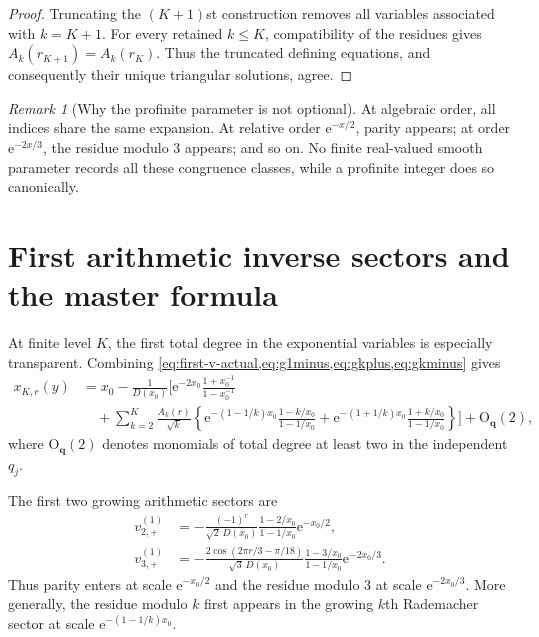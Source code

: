 \documentclass[11pt,a4paper]{article}
\numberwithin{equation}{section}
\theoremstyle{remark}
\newtheorem{remark}[theorem]{Remark}
\newcommand{\e}{\mathrm e}
\newcommand{\bigO}{\mathrm O}
\begin{document}
\begin{proof}
Truncating the $(K+1)$st construction removes all variables associated with $k=K+1$.  For every retained $k\le K$, compatibility of the residues gives
$A_k(r_{K+1})=A_k(r_K)$.  Thus the truncated defining equations, and consequently their unique triangular solutions, agree.
\end{proof}

\begin{remark}[Why the profinite parameter is not optional]
At algebraic order, all indices share the same expansion.  At relative order $\e^{-x/2}$, parity appears; at order $\e^{-2x/3}$, the residue modulo $3$ appears; and so on.  No finite real-valued smooth parameter records all these congruence classes, while a profinite integer does so canonically.
\end{remark}

\section{First arithmetic inverse sectors and the master formula}\label{sec:first-inverse-sectors}

At finite level $K$, the first total degree in the exponential variables is especially transparent.  Combining \cref{eq:first-v-actual,eq:g1minus,eq:gkplus,eq:gkminus} gives
\begin{align}
 x_{K,r}(y)
 &=x_0-\frac1{D(x_0)}\Biggl[
 \e^{-2x_0}\frac{1+x_0^{-1}}{1-x_0^{-1}}
 \label{eq:first-all-sectors}\\
 &\quad+\sum_{k=2}^{K}\frac{A_k(r)}{\sqrt{k}}
 \left\{
 \e^{-(1-1/k)x_0}\frac{1-k/x_0}{1-1/x_0}
 +\e^{-(1+1/k)x_0}\frac{1+k/x_0}{1-1/x_0}
 \right\}\Biggr]
 +\bigO_{\bm q}(2),\nonumber
\end{align}
where $\bigO_{\bm q}(2)$ denotes monomials of total degree at least two in the independent $q_j$.

The first two growing arithmetic sectors are
\begin{align}
 v_{2,+}^{(1)}
 &=-\frac{(-1)^r}{\sqrt2\,D(x_0)}
 \frac{1-2/x_0}{1-1/x_0}\e^{-x_0/2},
 \label{eq:k2-inverse}\\
 v_{3,+}^{(1)}
 &=-\frac{2\cos(2\pi r/3-\pi/18)}{\sqrt3\,D(x_0)}
 \frac{1-3/x_0}{1-1/x_0}\e^{-2x_0/3}.
 \label{eq:k3-inverse}
\end{align}
Thus parity enters at scale $\e^{-x_0/2}$ and the residue modulo $3$ at scale $\e^{-2x_0/3}$.  More generally, the residue modulo $k$ first appears in the growing $k$th Rademacher sector at scale $\e^{-(1-1/k)x_0}$.
\end{document}
